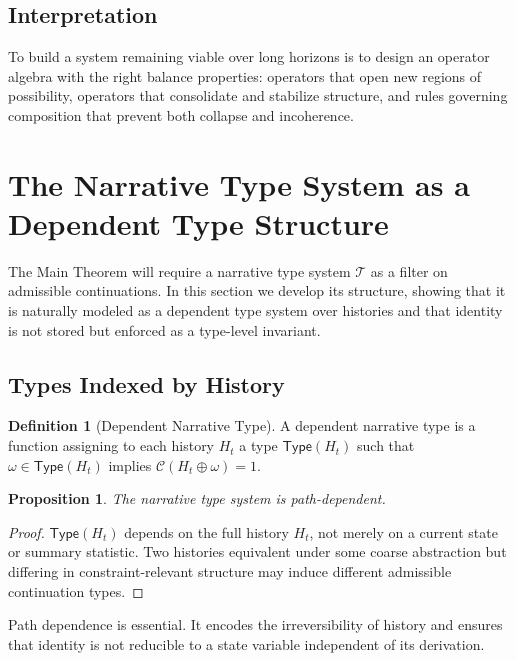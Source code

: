 \documentclass[12pt, a4paper]{article}
\theoremstyle{plain}
\newtheorem{proposition}[theorem]{Proposition}
\theoremstyle{definition}
\newtheorem{definition}[theorem]{Definition}
\theoremstyle{remark}
\begin{document}
\subsection{Interpretation}

To build a system remaining viable over long horizons is to design an operator algebra with the right balance properties: operators that open new regions of possibility, operators that consolidate and stabilize structure, and rules governing composition that prevent both collapse and incoherence.

\section{The Narrative Type System as a Dependent Type Structure}

The Main Theorem will require a narrative type system $\mathcal{T}$ as a filter on admissible continuations. In this section we develop its structure, showing that it is naturally modeled as a dependent type system over histories and that identity is not stored but enforced as a type-level invariant.

\subsection{Types Indexed by History}

\begin{definition}[Dependent Narrative Type]
A dependent narrative type is a function assigning to each history $H_t$ a type $\mathsf{Type}(H_t)$ such that $\omega \in \mathsf{Type}(H_t)$ implies $\mathcal{C}(H_t \oplus \omega) = 1$.
\end{definition}

\begin{proposition}
The narrative type system is path-dependent.
\end{proposition}

\begin{proof}
$\mathsf{Type}(H_t)$ depends on the full history $H_t$, not merely on a current state or summary statistic. Two histories equivalent under some coarse abstraction but differing in constraint-relevant structure may induce different admissible continuation types.
\end{proof}

Path dependence is essential. It encodes the irreversibility of history and ensures that identity is not reducible to a state variable independent of its derivation.
\end{document}
